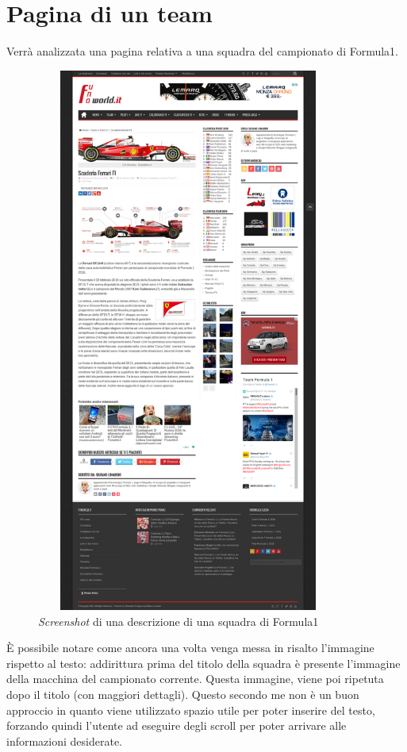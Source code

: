 \section{Pagina di un team}
Verrà analizzata una pagina relativa a una squadra del campionato di Formula1.

\begin{figure}[h] %
  \centering
  \includegraphics[height=18cm, width=10cm]{res/img/TeamPage_Full}
  \caption{\textit{Screenshot} di una descrizione di una squadra di Formula1}
\end{figure}

È possibile notare come ancora una volta venga messa in risalto l'immagine
rispetto al testo: addirittura prima del titolo della squadra è presente
l'immagine della macchina del campionato corrente. Questa immagine, viene poi
ripetuta dopo il titolo (con maggiori dettagli). Questo secondo me non è un buon
approccio in quanto viene utilizzato spazio utile per poter inserire del testo,
forzando quindi l'utente ad eseguire degli scroll per poter arrivare alle
informazioni desiderate.

